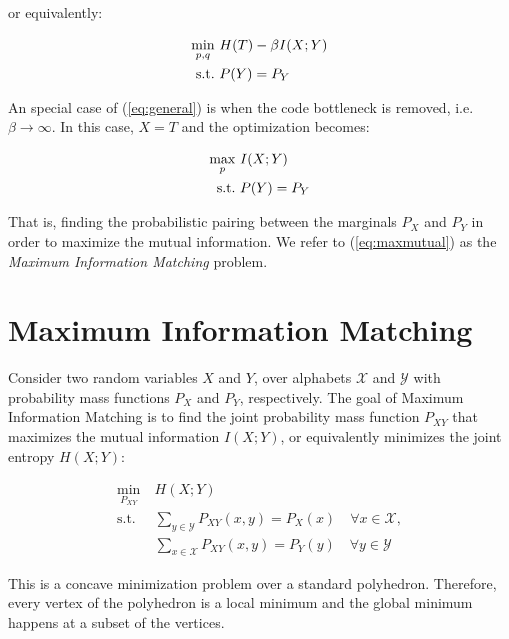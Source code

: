 or equivalently:

\begin{equation} 
\begin{aligned} \label{eq:general}
    \min_{p, q} \ &H(T) - \beta I(X;Y) \\
    \textrm{s.t.} \ &P(Y) = P_Y
\end{aligned}
\end{equation}

An special case of (\ref{eq:general}) is when the code bottleneck is removed, i.e. $\beta \to \infty$. In this case, $X=T$ and the optimization becomes:

\begin{equation} 
\begin{aligned} \label{eq:maxmutual}
    \max_{p} \ &I(X;Y) \\
    \textrm{s.t.} \ &P(Y) = P_Y \\
\end{aligned}
\end{equation}

That is, finding the probabilistic pairing between the marginals $P_X$ and $P_Y$ in order to maximize the mutual information. We refer to (\ref{eq:maxmutual}) as the \textit{Maximum Information Matching} problem.


\section{Maximum Information Matching}

Consider two random variables $X$ and $Y$, over alphabets $\mathcal{X}$ and $\mathcal{Y}$ with probability mass functions $P_X$ and $P_Y$, respectively. The goal of Maximum Information Matching is to find the joint probability mass function $P_{XY}$ that maximizes the mutual information $I(X;Y)$, or equivalently minimizes the joint entropy $H(X;Y)$:

\begin{equation} 
\begin{aligned} \label{eq:minent}
    \min_{P_{XY}} \ &H(X;Y) \\
    \textrm{s.t.} \
        &\sum_{y\in\mathcal{Y}} P_{XY}(x, y) = P_X(x) \quad \forall x\in{\mathcal{X}},  \\
        &\sum_{x\in\mathcal{X}} P_{XY}(x, y) = P_Y(y) \quad \forall y\in{\mathcal{Y}}
\end{aligned}
\end{equation}

This is a concave minimization problem over a standard polyhedron. Therefore, every vertex of the polyhedron is a local minimum and the global minimum happens at a subset of the vertices.

